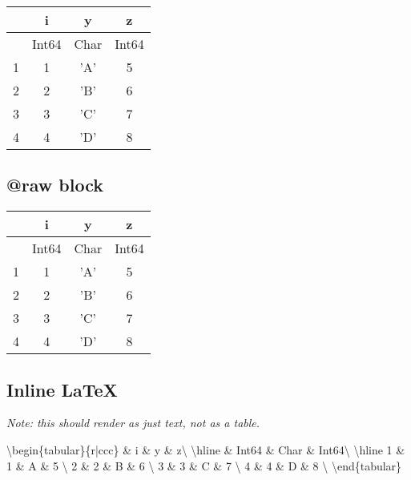 \begin{tabular}{r|ccc}
        & i & y & z\\
        \hline
        & Int64 & Char & Int64\\
        \hline
        1 & 1 & 'A' & 5 \\
        2 & 2 & 'B' & 6 \\
        3 & 3 & 'C' & 7 \\
        4 & 4 & 'D' & 8 \\
\end{tabular}


\subsection{@raw block}



\label{12968435574917214693}{}



\begin{tabular}{r|ccc}
        & i & y & z\\
        \hline
        & Int64 & Char & Int64\\
        \hline
        1 & 1 & 'A' & 5 \\
        2 & 2 & 'B' & 6 \\
        3 & 3 & 'C' & 7 \\
        4 & 4 & 'D' & 8 \\
\end{tabular}



\subsection{Inline LaTeX}



\label{7647595013011656041}{}


\emph{Note: this should render as just text, not as a table.}



{\textbackslash}begin\{tabular\}\{r|ccc\}         \& i \& y \& z{\textbackslash}
        {\textbackslash}hline         \& Int64 \& Char \& Int64{\textbackslash}
        {\textbackslash}hline         1 \& 1 \& {\textquotesingle}A{\textquotesingle} \& 5 {\textbackslash}
        2 \& 2 \& {\textquotesingle}B{\textquotesingle} \& 6 {\textbackslash}
        3 \& 3 \& {\textquotesingle}C{\textquotesingle} \& 7 {\textbackslash}
        4 \& 4 \& {\textquotesingle}D{\textquotesingle} \& 8 {\textbackslash}
{\textbackslash}end\{tabular\}




